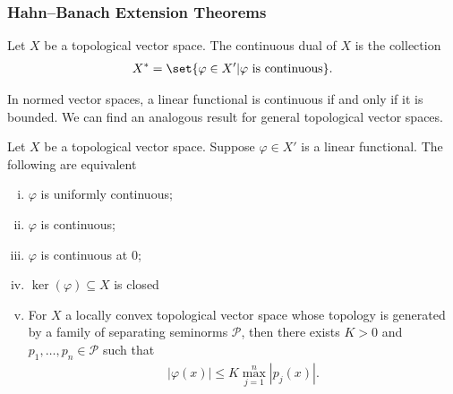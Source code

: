 \documentclass[10pt]{mypackage}
\begin{document}
\subsubsection{Hahn--Banach Extension Theorems}%
\begin{definition}
  Let $X$ be a topological vector space. The continuous dual of $X$ is the collection 
  \begin{align*}
    X^{\ast} = \set{\varphi\in X' | \varphi\text{ is continuous}}.
  \end{align*}
\end{definition}
In normed vector spaces, a linear functional is continuous if and only if it is bounded. We can find an analogous result for general topological vector spaces.
\begin{proposition}
  Let $X$ be a topological vector space. Suppose $\varphi\in X'$ is a linear functional. The following are equivalent
  \begin{enumerate}[(i)]
    \item $\varphi$ is uniformly continuous;
    \item $\varphi$ is continuous;
    \item $\varphi$ is continuous at $0$;
    \item $\ker\left(\varphi\right)\subseteq X$ is closed
    \item For $X$ a locally convex topological vector space whose topology is generated by a family of separating seminorms $\mathcal{P}$, then there exists $K > 0$ and $p_1,\dots,p_n\in \mathcal{P}$ such that
      \begin{align*}
        \left\vert \varphi(x) \right\vert \leq K \max_{j=1}^{n}\left\vert p_j(x) \right\vert.
      \end{align*}
  \end{enumerate}
\end{proposition}
\end{document}
